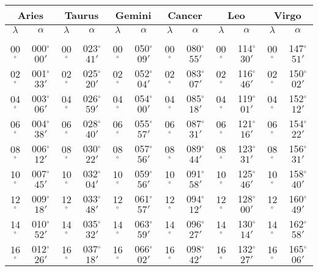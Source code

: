 \begin{table}
\centering
{\small \begin{tabular}{cc|cc|cc|cc|cc|cc}
\multicolumn{2}{c}{Aries}\vline & \multicolumn{2}{c}{Taurus} \vline& \multicolumn{2}{c}{Gemini} \vline& \multicolumn{2}{c}{Cancer}\vline &
\multicolumn{2}{c}{Leo}\vline & \multicolumn{2}{c}{Virgo}\\\hline
$\lambda$& $\alpha$& $\lambda$& $\alpha$& $\lambda$& $\alpha$& $\lambda$& $\alpha$& $\lambda$& $\alpha$& $\lambda$& $\alpha$\\\hline
&&&&&&&&&&&\\[-2ex]
00$^\circ$ & 000$^\circ$$00'$ & 00$^\circ$ & 023$^\circ$$41'$ & 00$^\circ$ & 050$^\circ$$09'$ & 00$^\circ$ & 080$^\circ$$55'$ & 00$^\circ$ & 114$^\circ$$30'$ & 00$^\circ$ & 147$^\circ$$51'$\\
02$^\circ$ & 001$^\circ$$33'$ & 02$^\circ$ & 025$^\circ$$20'$ & 02$^\circ$ & 052$^\circ$$04'$ & 02$^\circ$ & 083$^\circ$$07'$ & 02$^\circ$ & 116$^\circ$$46'$ & 02$^\circ$ & 150$^\circ$$02'$\\
04$^\circ$ & 003$^\circ$$06'$ & 04$^\circ$ & 026$^\circ$$59'$ & 04$^\circ$ & 054$^\circ$$00'$ & 04$^\circ$ & 085$^\circ$$18'$ & 04$^\circ$ & 119$^\circ$$01'$ & 04$^\circ$ & 152$^\circ$$12'$\\
06$^\circ$ & 004$^\circ$$38'$ & 06$^\circ$ & 028$^\circ$$40'$ & 06$^\circ$ & 055$^\circ$$57'$ & 06$^\circ$ & 087$^\circ$$31'$ & 06$^\circ$ & 121$^\circ$$16'$ & 06$^\circ$ & 154$^\circ$$22'$\\
08$^\circ$ & 006$^\circ$$12'$ & 08$^\circ$ & 030$^\circ$$22'$ & 08$^\circ$ & 057$^\circ$$56'$ & 08$^\circ$ & 089$^\circ$$44'$ & 08$^\circ$ & 123$^\circ$$31'$ & 08$^\circ$ & 156$^\circ$$31'$\\
10$^\circ$ & 007$^\circ$$45'$ & 10$^\circ$ & 032$^\circ$$04'$ & 10$^\circ$ & 059$^\circ$$56'$ & 10$^\circ$ & 091$^\circ$$58'$ & 10$^\circ$ & 125$^\circ$$46'$ & 10$^\circ$ & 158$^\circ$$40'$\\
12$^\circ$ & 009$^\circ$$18'$ & 12$^\circ$ & 033$^\circ$$48'$ & 12$^\circ$ & 061$^\circ$$57'$ & 12$^\circ$ & 094$^\circ$$12'$ & 12$^\circ$ & 128$^\circ$$00'$ & 12$^\circ$ & 160$^\circ$$49'$\\
14$^\circ$ & 010$^\circ$$52'$ & 14$^\circ$ & 035$^\circ$$32'$ & 14$^\circ$ & 063$^\circ$$59'$ & 14$^\circ$ & 096$^\circ$$27'$ & 14$^\circ$ & 130$^\circ$$14'$ & 14$^\circ$ & 162$^\circ$$58'$\\
16$^\circ$ & 012$^\circ$$26'$ & 16$^\circ$ & 037$^\circ$$18'$ & 16$^\circ$ & 066$^\circ$$02'$ & 16$^\circ$ & 098$^\circ$$42'$ & 16$^\circ$ & 132$^\circ$$27'$ & 16$^\circ$ & 165$^\circ$$06'$\\

\end{tabular}}
\end{table}
